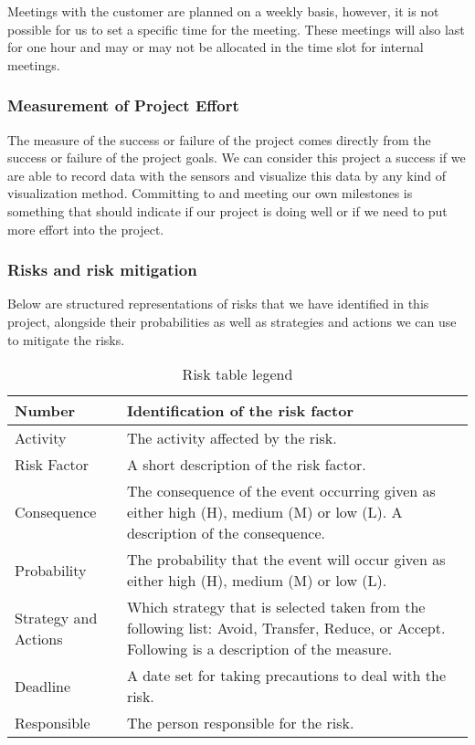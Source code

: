 \documentclass[../document.tex]{subfiles}
\begin{document}
Meetings with the customer are planned on a weekly basis, however, it is not possible for us to set a specific time for the meeting. These meetings will also last for one hour and may or may not be allocated in the time slot for internal meetings.

\subsubsection{Measurement of Project Effort}
The measure of the success or failure of the project comes directly from the success or failure of the project goals. We can consider this project a success if we are able to record data with the sensors and visualize this data by any kind of visualization method. Committing to and meeting our own milestones is something that should indicate if our project is doing well or if we need to put more effort into the project.

\subsubsection{Risks and risk mitigation}
Below are structured representations of risks that we have identified in this project, alongside their probabilities as well as strategies and actions we can use to mitigate the risks.

\begin{table}[H]
\caption{Risk table legend}
\begin{tabularx}{\textwidth}{|l|X|}
\hline
Number
&Identification of the risk factor
\\ \hline Activity
&The activity affected by the risk.
\\ \hline Risk Factor
&A short description of the risk factor.
\\ \hline Consequence
&The consequence of the event occurring given as either high (H), medium (M) or low (L). A description of the consequence.
\\ \hline Probability
&The probability that the event will occur given as either high (H), medium (M) or low (L).
\\ \hline Strategy and Actions
&Which strategy that is selected taken from the following list: Avoid, Transfer, Reduce, or Accept. Following is a description of the measure.
\\ \hline Deadline
&A date set for taking precautions to deal with the risk.
\\ \hline Responsible
&The person responsible for the risk.
\\ \hline
\end{tabularx}
\end{table}
\end{document}
